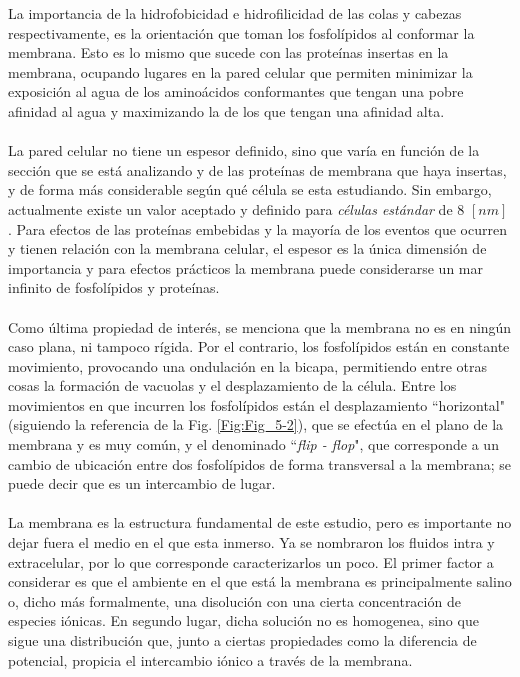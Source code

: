 \documentclass[12pt, oneside, numbers, spanish]{ezthesis}
\numberwithin{equation}{section}
\begin{document}
\noindent
%	
La importancia de la hidrofobicidad e hidrofilicidad de las colas y cabezas respectivamente, es la orientación que toman los fosfolípidos al conformar la membrana. Esto es lo mismo que sucede con las proteínas insertas en la membrana, ocupando lugares en la pared celular que permiten minimizar la exposición al agua de los aminoácidos conformantes que tengan una pobre afinidad al agua y maximizando la de los que tengan una afinidad alta.\\\\
La pared celular no tiene un espesor definido, sino que varía en función de la sección que se está analizando y de las proteínas de membrana que haya insertas, y de forma más considerable según qué célula se esta estudiando. Sin embargo, actualmente existe un valor aceptado y definido para \textit{células estándar} de 8 $[nm]$ \cite{Lombard}. Para efectos de las proteínas embebidas y la mayoría de los eventos que ocurren y tienen relación con la membrana celular, el espesor es la única dimensión de importancia y para efectos prácticos la membrana puede considerarse un mar infinito de fosfolípidos y proteínas.\\\\
Como última propiedad de interés, se menciona que la membrana no es en ningún caso plana, ni tampoco rígida. Por el contrario, los fosfolípidos están en constante movimiento, provocando una ondulación en la bicapa, permitiendo entre otras cosas la formación de vacuolas y el desplazamiento de la célula. Entre los movimientos en que incurren los fosfolípidos están el desplazamiento ``horizontal" (siguiendo la referencia de la Fig. \ref{Fig:Fig_5-2}), que se efectúa en el plano de la membrana y es muy común, y el denominado ``\textit{flip - flop}", que corresponde a un cambio de ubicación entre dos fosfolípidos de forma transversal a la membrana; se puede decir que es un intercambio de lugar.\\\\
La membrana es la estructura fundamental de este estudio, pero es importante no dejar fuera el medio en el que esta inmerso. Ya se nombraron los fluidos intra y extracelular, por lo que corresponde caracterizarlos un poco. El primer factor a considerar es que el ambiente en el que está la membrana es principalmente salino o, dicho más formalmente, una disolución con una cierta concentración de especies iónicas. En segundo lugar, dicha solución no es homogenea, sino que sigue una distribución que, junto a ciertas propiedades como la diferencia de potencial, propicia el intercambio iónico a través de la membrana.
\end{document}
